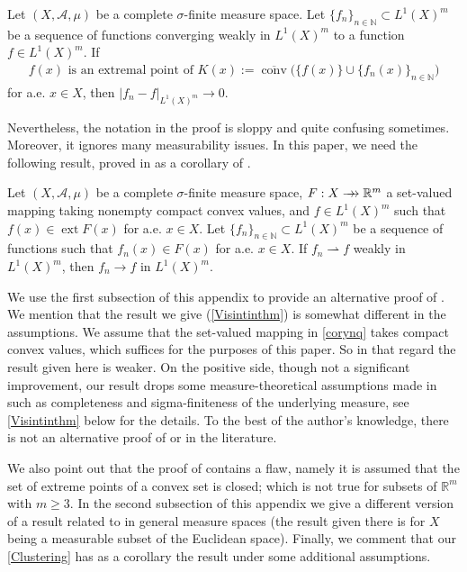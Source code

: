 \documentclass[hidelinks,onefignum,onetabnum]{siamart220329}
\newcommand{\rrightarrow}{\mathrel{\mathrlap{\rightarrow}\mkern1mu\rightarrow}}
\let\twoheadrightarrow\rrightarrow
\newcommand{\ext}{\operatorname{ext}}
\newcommand{\clconv}{\overline{\operatorname{conv}}}
\begin{document}
\begin{theorem} \cite[Theorem 1]{Visin}
	Let $(X,\mathcal A,\mu)$ be a complete $\sigma$-finite measure space. Let $\{f_n\}_{n\in\mathbb N}\subset L^1(X)^m$ be a sequence of functions converging weakly in $L^1(X)^m$ to a function $f\in L^1(X)^m$. If 
	\begin{align*}
		\text{$f(x)$ is an extremal point of $K(x):=\clconv\Big(\{f(x)\}\cup\{f_n(x)\}_{n\in\mathbb N}\Big)$}
	\end{align*}
		 for a.e. $x\in X$, then $|f_n-f|_{L^1(X)^m}\to 0$.
\end{theorem}

 Nevertheless, the notation in the proof \cite[Theorem 1]{Visin} is sloppy and quite confusing sometimes. Moreover, it ignores many measurability issues.  In this paper, we need the following result, proved in  \cite{Visin} as a corollary of  \cite[Theorem 1]{Visin}.
 \begin{corollary}\cite[Corollary 2]{Visin}\label{corynq}
 		Let $(X,\mathcal A,\mu)$ be a  complete $\sigma$-finite measure space, $F:X\twoheadrightarrow\mathbb R^m$ a set-valued mapping taking nonempty compact convex values, and $f\in {L^1(X)^m}$ such that $f(x)\in\ext F(x)$ for a.e. $x\in X$. Let  $\{f_n\}_{n\in\mathbb N}\subset {L^1(X)^m}$ be a sequence of functions such that $f_n(x)\in F(x)$ for a.e. $x\in X$. If $f_n\rightharpoonup f$  weakly in ${L^1(X)^m}$, then $f_n\to f$ in ${L^1(X)^m}$.
\end{corollary}
 
 We use the first subsection of this appendix to provide an alternative proof of \cite[Corollary 2]{Visin}. We mention that the result we give (\cref{Visintinthm}) is somewhat different in the assumptions. We assume that the set-valued mapping in \cref{corynq} takes compact convex values, which suffices for the purposes of this paper. So in  that regard the result given here is weaker. On the positive side, though not a significant improvement, our result drops some measure-theoretical assumptions made in  \cite{Visin}  such as completeness and sigma-finiteness of the underlying measure, see \cref{Visintinthm} below for the details.  To the best of the author's knowledge, there is not an alternative proof of \cite[Theorem~1]{Visin}  or \cite[Corollary 2]{Visin} in the literature.
 
 We also point out that the proof of \cite[Proposition 1]{Visin} contains a flaw, namely it is assumed that the set of extreme points of a convex set is closed;  which is not true for subsets of $\mathbb R^m$ with $m\ge3$.
 In the second subsection of this appendix we give a different version of a result related to \cite[Proposition 1]{Visin} in general measure spaces (the result given there is for $X$ being a measurable subset of the Euclidean space). Finally, we comment that our \cref{Clustering} has as a corollary the result \cite[Proposition 1]{Visin} under some additional assumptions.
\end{document}
